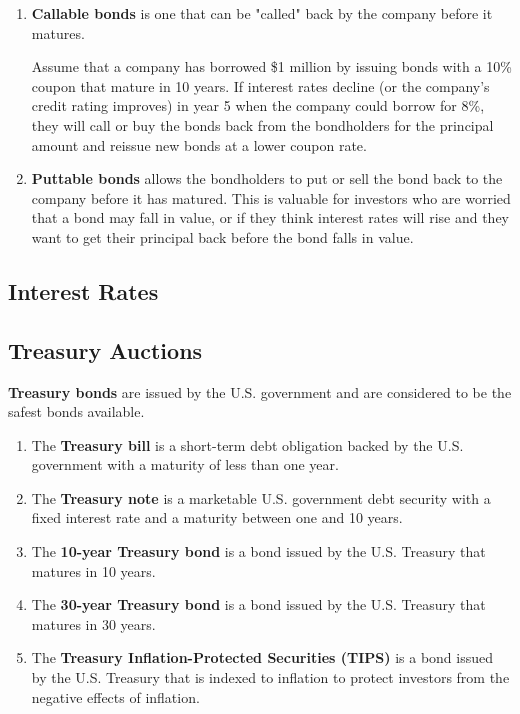 \documentclass{article}
\begin{document}
\begin{definition}
\begin{enumerate}
        \item \textbf{Callable bonds} is one that can be "called" back by the company before it matures. 
        
        Assume that a company has borrowed \$1 million by issuing bonds with a 10\% coupon that mature in 10 years. If interest rates decline (or the company’s credit rating improves) in year 5 when the company could borrow for 8\%, they will call or buy the bonds back from the bondholders for the principal amount and reissue new bonds at a lower coupon rate. 
        
        \item \textbf{Puttable bonds} allows the bondholders to put or sell the bond back to the company before it has matured. This is valuable for investors who are worried that a bond may fall in value, or if they think interest rates will rise and they want to get their principal back before the bond falls in value.
      \end{enumerate}
    \end{definition}

  \subsection{Interest Rates}

  \subsection{Treasury Auctions}

    \begin{definition}
      \textbf{Treasury bonds} are issued by the U.S. government and are considered to be the safest bonds available. 
      \begin{enumerate}
        \item The \textbf{Treasury bill} is a short-term debt obligation backed by the U.S. government with a maturity of less than one year. 
        \item The \textbf{Treasury note} is a marketable U.S. government debt security with a fixed interest rate and a maturity between one and 10 years.
        \item The \textbf{10-year Treasury bond} is a bond issued by the U.S. Treasury that matures in 10 years. 
        \item The \textbf{30-year Treasury bond} is a bond issued by the U.S. Treasury that matures in 30 years. 
        \item The \textbf{Treasury Inflation-Protected Securities (TIPS)} is a bond issued by the U.S. Treasury that is indexed to inflation to protect investors from the negative effects of inflation. 
      \end{enumerate}
    \end{definition}
\end{document}
